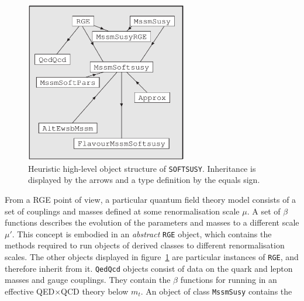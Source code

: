 \documentclass{article}
\def\SOFTSUSY{{\tt SOFTSUSY}}
\def\code#1{\small{\tt #1}\normalsize}
\begin{document}
\begin{figure}\begin{center}
\includegraphics[width=200pt]{rpcobj.eps}
\caption{ \label{fig:objstruc} Heuristic high-level object structure of \SOFTSUSY\@. Inheritance is
displayed by the arrows and a type definition by the equals
sign.}\end{center}\end{figure} 
From a RGE point of view, a particular
quantum 
field theory model consists of a set of couplings and masses defined at some
renormalisation scale $\mu$. A set of $\beta$ functions describes the evolution
of the parameters and masses to a different scale $\mu'$. This concept
is embodied in an {\em abstract} \code{RGE} object, which contains the
methods required to run objects of derived classes to different
renormalisation scales. The other objects displayed in
figure~\ref{fig:objstruc} are particular instances of \code{RGE}, and
therefore inherit from it.
\code{QedQcd} objects consist of data on the 
quark and lepton masses and gauge couplings.
They contain the $\beta$ functions for
running in an effective QED$\times$QCD theory below $m_t$.
An object of class \code{MssmSusy} contains the
\end{document}
